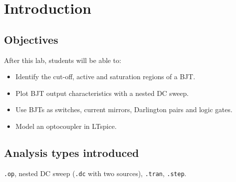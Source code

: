 \section{Introduction}


\subsection{Objectives}
After this lab, students will be able to:
\begin{itemize}[itemsep=2pt]
  \item Identify the cut-off, active and saturation regions of a BJT.
  \item Plot BJT output characteristics with a nested DC sweep.
  \item Use BJTs as switches, current mirrors, Darlington pairs and logic gates.
  \item Model an optocoupler in LTspice.
\end{itemize}

\subsection{Analysis types introduced}
\texttt{.op}, nested DC sweep (\texttt{.dc} with two sources), \texttt{.tran}, \texttt{.step}.

